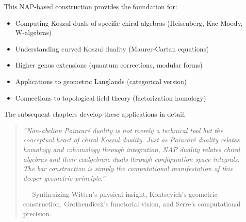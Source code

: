 \begin{remark}\label{rem:looking-ahead}
This NAP-based construction provides the foundation for:
\begin{itemize}
\item Computing Koszul duals of specific chiral algebras (Heisenberg, Kac-Moody, W-algebras)
\item Understanding curved Koszul duality (Maurer-Cartan equations)
\item Higher genus extensions (quantum corrections, modular forms)
\item Applications to geometric Langlands (categorical version)
\item Connections to topological field theory (factorization homology)
\end{itemize}

The subsequent chapters develop these applications in detail.
\end{remark}

\begin{quote}
\textit{``Non-abelian Poincaré duality is not merely a technical tool but the conceptual heart of chiral Koszul duality. Just as Poincaré duality relates homology and cohomology through integration, NAP duality relates chiral algebras and their coalgebraic duals through configuration space integrals. The bar construction is simply the computational manifestation of this deeper geometric principle.''}

--- Synthesizing Witten's physical insight, Kontsevich's geometric construction, Grothendieck's functorial vision, and Serre's computational precision.
\end{quote}